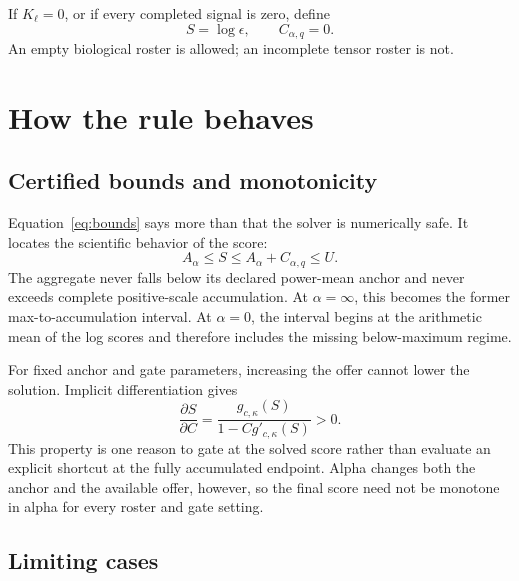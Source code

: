 \documentclass[11pt]{article}
\begin{document}
If $K_\ell=0$, or if every completed signal is zero, define
\[
S=\log\epsilon,\qquad C_{\alpha,q}=0.
\]
An empty biological roster is allowed; an incomplete tensor roster is not.

\section{How the rule behaves}

\subsection{Certified bounds and monotonicity}

Equation~\eqref{eq:bounds} says more than that the solver is numerically safe.
It locates the scientific behavior of the score:
\[
A_\alpha
\leq S
\leq A_\alpha+C_{\alpha,q}
\leq U.
\]
The aggregate never falls below its declared power-mean anchor and never
exceeds complete positive-scale accumulation. At $\alpha=\infty$, this becomes
the former max-to-accumulation interval. At $\alpha=0$, the interval begins at
the arithmetic mean of the log scores and therefore includes the missing
below-maximum regime.

For fixed anchor and gate parameters, increasing the offer cannot lower the
solution. Implicit differentiation gives
\begin{equation}
\frac{\partial S}{\partial C}
=
\frac{g_{c,\kappa}(S)}
{1-Cg'_{c,\kappa}(S)}
>0.
\end{equation}
This property is one reason to gate at the solved score rather than evaluate
an explicit shortcut at the fully accumulated endpoint. Alpha changes both
the anchor and the available offer, however, so the final score need not be
monotone in alpha for every roster and gate setting.

\subsection{Limiting cases}
\end{document}
